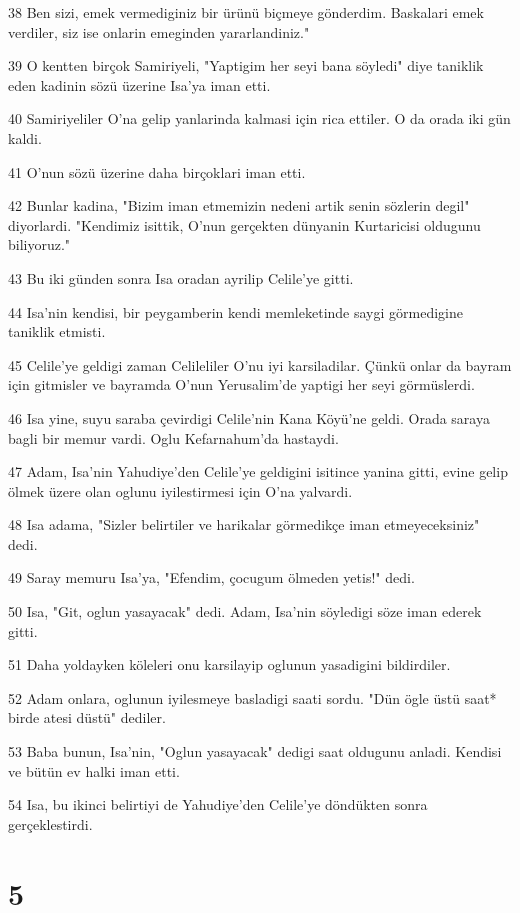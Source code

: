 \par 38 Ben sizi, emek vermediginiz bir ürünü biçmeye gönderdim. Baskalari emek verdiler, siz ise onlarin emeginden yararlandiniz."
\par 39 O kentten birçok Samiriyeli, "Yaptigim her seyi bana söyledi" diye taniklik eden kadinin sözü üzerine Isa'ya iman etti.
\par 40 Samiriyeliler O'na gelip yanlarinda kalmasi için rica ettiler. O da orada iki gün kaldi.
\par 41 O'nun sözü üzerine daha birçoklari iman etti.
\par 42 Bunlar kadina, "Bizim iman etmemizin nedeni artik senin sözlerin degil" diyorlardi. "Kendimiz isittik, O'nun gerçekten dünyanin Kurtaricisi oldugunu biliyoruz."
\par 43 Bu iki günden sonra Isa oradan ayrilip Celile'ye gitti.
\par 44 Isa'nin kendisi, bir peygamberin kendi memleketinde saygi görmedigine taniklik etmisti.
\par 45 Celile'ye geldigi zaman Celileliler O'nu iyi karsiladilar. Çünkü onlar da bayram için gitmisler ve bayramda O'nun Yerusalim'de yaptigi her seyi görmüslerdi.
\par 46 Isa yine, suyu saraba çevirdigi Celile'nin Kana Köyü'ne geldi. Orada saraya bagli bir memur vardi. Oglu Kefarnahum'da hastaydi.
\par 47 Adam, Isa'nin Yahudiye'den Celile'ye geldigini isitince yanina gitti, evine gelip ölmek üzere olan oglunu iyilestirmesi için O'na yalvardi.
\par 48 Isa adama, "Sizler belirtiler ve harikalar görmedikçe iman etmeyeceksiniz" dedi.
\par 49 Saray memuru Isa'ya, "Efendim, çocugum ölmeden yetis!" dedi.
\par 50 Isa, "Git, oglun yasayacak" dedi. Adam, Isa'nin söyledigi söze iman ederek gitti.
\par 51 Daha yoldayken köleleri onu karsilayip oglunun yasadigini bildirdiler.
\par 52 Adam onlara, oglunun iyilesmeye basladigi saati sordu. "Dün ögle üstü saat* birde atesi düstü" dediler.
\par 53 Baba bunun, Isa'nin, "Oglun yasayacak" dedigi saat oldugunu anladi. Kendisi ve bütün ev halki iman etti.
\par 54 Isa, bu ikinci belirtiyi de Yahudiye'den Celile'ye döndükten sonra gerçeklestirdi.

\chapter{5}


